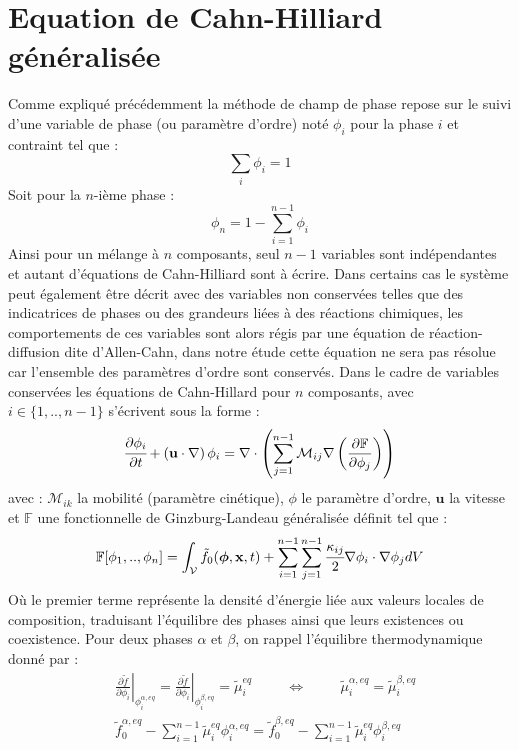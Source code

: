 \documentclass[a4paper,11pt,fleqn]{report}    %
\begin{document}
\section{Equation de Cahn-Hilliard généralisée}
Comme expliqué précédemment la méthode de champ de phase repose sur le suivi d'une variable de phase (ou paramètre d'ordre) noté $\phi_i$ pour la phase $i$ et contraint tel que : 
\begin{equation}
\sum_i \phi_i =1
\end{equation} 
Soit pour la $n$-ième phase :
\begin{equation}
\phi_n =1 - \sum_{i=1}^{n-1} \phi_i
\end{equation} 
Ainsi pour un mélange à $n$ composants, seul $n-1$ variables sont indépendantes et autant d'équations de Cahn-Hilliard sont à écrire. Dans certains cas le système peut également être décrit avec des variables non conservées telles que des indicatrices de phases ou des grandeurs liées à des réactions chimiques, les comportements de ces variables sont alors régis par une équation de réaction-diffusion dite d'Allen-Cahn, dans notre étude cette équation ne sera pas résolue car l'ensemble des paramètres d'ordre sont conservés. Dans le cadre de variables conservées les équations de Cahn-Hillard pour $n$ composants, avec $i\in \{1,..,n-1 \}$ s'écrivent sous la forme :
\begin{equation}
\cfrac{\partial \phi_i}{\partial t} + \left(\mathbf{u} \cdot \nabla\right) \phi_i=  \nabla \cdot \left(\sum_{j=1}^{n-1}{\mathcal{M}_{ij}} \nabla\left( \frac{\partial \mathbb{F}}{\partial \phi_j}\right) \right) 
\end{equation}
avec : $\mathcal{M}_{ik}$ la mobilité (paramètre cinétique),  $\phi$ le paramètre d'ordre, $\mathbf{u}$ la vitesse et $\mathbb{F}$ une fonctionnelle de Ginzburg-Landeau généralisée \cite{cardon_modelisation_2016} définit tel que : 
 \begin{equation}
\mathbb{F}[\phi_1,..,\phi_n] = \int_{\mathcal{V}}\tilde{f}_0(\bm{\phi},\mathbf{x},t)+ \sum_{i=1}^{n-1}\sum_{j=1}^{n-1}\cfrac{\kappa_{ij}}{2}\nabla \phi_i \cdot \nabla \phi_j dV
\end{equation}
Où le premier terme représente la densité d'énergie liée aux valeurs locales de composition, traduisant l'équilibre des phases ainsi que leurs existences ou coexistence. Pour deux phases $\alpha$ et $\beta$, on rappel l'équilibre thermodynamique donné par :
\begin{subequations}
	\begin{align}
		&\left.\frac{\partial \tilde{f}}{\partial \phi_i}\right|_{\phi_i^{\alpha,eq}} = \left.\frac{\partial \tilde{f}}{\partial \phi_i}\right|_{\phi_i^{\beta,eq}} = \tilde{\mu}_i^{eq} \hspace{1cm} \Leftrightarrow   \hspace{1cm} \tilde{\mu}_i^{\alpha,eq} = \tilde{\mu}_i^{\beta,eq} \\
		& 		\tilde{f}_0^{\alpha,eq} - \sum_{i=1}^{n-1}\tilde{\mu}_i^{eq}\phi_i^{\alpha,eq} = 	\tilde{f}_0^{\beta,eq} - \sum_{i=1}^{n-1}\tilde{\mu}_i^{eq}\phi_i^{\beta,eq}
	\end{align} 
\end{subequations}
\end{document}
